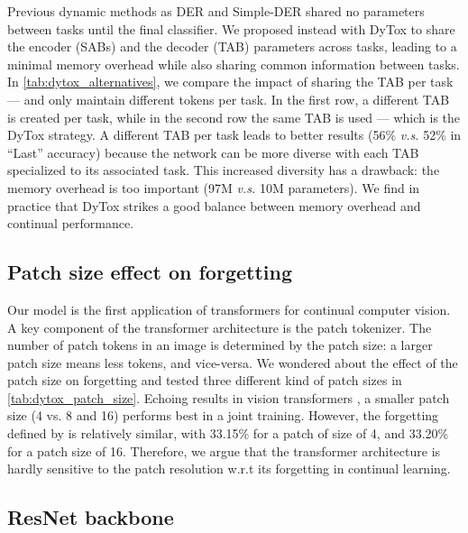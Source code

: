 Previous dynamic methods as DER \citep{yan2021der} and Simple-DER \citep{li2021preserve} shared no
parameters between tasks until the final classifier. We proposed instead with DyTox to share the
encoder (SABs) and the decoder (TAB) parameters across tasks, leading to a minimal memory overhead
while also sharing common information between tasks. In \autoref{tab:dytox_alternatives}, we compare
the impact of sharing the TAB per task --- and only maintain different tokens per task. In the first
row, a different TAB is created per task, while in the second row the same TAB is used --- which is
the DyTox strategy. A different TAB per task leads to better results (56\% \textit{v.s.} 52\% in
``Last'' accuracy) because the network can be more diverse with each TAB specialized to its
associated task. This increased diversity has a drawback: the memory overhead is too important (97M
\textit{v.s.} 10M parameters). We find in practice that DyTox strikes a good balance between memory
overhead and continual performance.





\subsection{Patch size effect on forgetting}

Our model is the first application of transformers for continual computer vision. A key component of
the transformer architecture is the patch tokenizer. The number of patch tokens in an image is
determined by the patch size: a larger patch size means less tokens, and vice-versa. We wondered
about the effect of the patch size on forgetting and tested three different kind of patch sizes in
\autoref{tab:dytox_patch_size}. Echoing results in vision transformers
\citep{dosovitskiy2020vit,touvron2021deit}, a smaller patch size (4 vs. 8 and 16) performs best in a
joint training. However, the forgetting defined by \citet{chaudhry2018riemannien_walk} is relatively
similar, with 33.15\% for a patch of size of 4, and 33.20\% for a patch size of 16. Therefore, we
argue that the transformer architecture is hardly sensitive to the patch resolution w.r.t its
forgetting in continual learning.



%   

\subsection{ResNet backbone}


